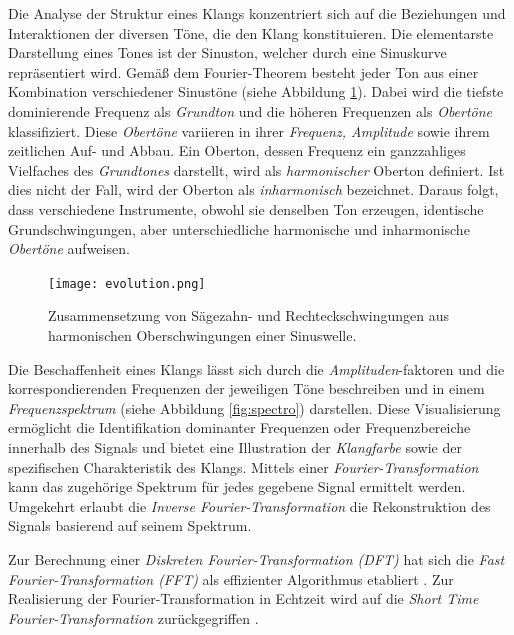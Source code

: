 \documentclass[
  a4paper,  %
  twoside,  %
  bibliography=totoc,
  headsepline,
  cleardoublepage=empty,
  parskip=half,
  draft=false
]{scrbook}
\begin{document}
Die Analyse der Struktur eines Klangs konzentriert sich auf die Beziehungen und Interaktionen der diversen Töne, die den Klang konstituieren. Die elementarste Darstellung eines Tones ist der Sinuston, welcher durch eine Sinuskurve repräsentiert wird. Gemäß dem Fourier-Theorem besteht jeder Ton aus einer Kombination verschiedener Sinustöne (siehe Abbildung \ref{fig:evolution}). Dabei wird die tiefste dominierende Frequenz als \emph{Grundton} und die höheren Frequenzen als \emph{Obertöne} klassifiziert. Diese \emph{Obertöne} variieren in ihrer \emph{Frequenz, Amplitude} sowie ihrem zeitlichen Auf- und Abbau. Ein Oberton, dessen Frequenz ein ganzzahliges Vielfaches des \emph{Grundtones} darstellt, wird als \emph{harmonischer} Oberton definiert. Ist dies nicht der Fall, wird der Oberton als \emph{inharmonisch} bezeichnet. Daraus folgt, dass verschiedene Instrumente, obwohl sie denselben Ton erzeugen, identische Grundschwingungen, aber unterschiedliche harmonische und inharmonische \emph{Obertöne} aufweisen. \cite{parker_good_2009, white_physics_2014, ruschkowski_elektronische_2019}

\begin{figure}
  \centering
  \texttt{[image: evolution.png]}
  \caption[Fourier Reihe]{Zusammensetzung von Sägezahn- und Rechteckschwingungen aus harmonischen Oberschwingungen einer Sinuswelle.}
  \label{fig:evolution}
\end{figure}

Die Beschaffenheit eines Klangs lässt sich durch die \emph{Amplituden}-faktoren und die korrespondierenden Frequenzen der jeweiligen Töne beschreiben und in einem \emph{Frequenzspektrum} (siehe Abbildung \ref{fig:spectro}) darstellen. Diese Visualisierung ermöglicht die Identifikation dominanter Frequenzen oder Frequenzbereiche innerhalb des Signals und bietet eine Illustration der \emph{Klangfarbe} sowie der spezifischen Charakteristik des Klangs. Mittels einer \emph{Fourier-Transformation} kann das zugehörige Spektrum für jedes gegebene Signal ermittelt werden. Umgekehrt erlaubt die \emph{Inverse Fourier-Transformation} die Rekonstruktion des Signals basierend auf seinem Spektrum. \cite{raffaseder_audiodesign_2010}

Zur Berechnung einer \emph{Diskreten Fourier-Transformation (DFT)} hat sich die \emph{Fast Fourier-Transformation (FFT)} als effizienter Algorithmus etabliert \cite{heideman_gauss_1985}. Zur Realisierung der Fourier-Transformation in Echtzeit wird auf die \emph{Short Time Fourier-Transformation} zurückgegriffen \cite{thyagarajan_introduction_2019}. 
\end{document}
